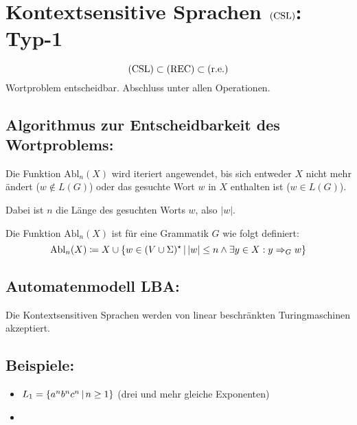 \chapter{Kontextsensitive Sprachen $\mathrm{(CSL)}$: Typ-1}
\begin{equation*}
	\mathrm{(CSL)}\subset\mathrm{(REC)}\subset\mathrm{(r.e.)}
\end{equation*}
Wortproblem entscheidbar. Abschluss unter allen Operationen.

\section{Algorithmus zur Entscheidbarkeit des Wortproblems:}
Die Funktion $\mathrm{Abl}_n(X)$ wird iteriert angewendet, bis sich entweder $X$ nicht mehr ändert ($w\not\in L(G)$) oder das gesuchte Wort $w$ in $X$ enthalten ist ($w\in L(G)$).

Dabei ist $n$ die Länge des gesuchten Worts $w$, also $|w|$.

Die Funktion $\mathrm{Abl}_n(X)$ ist für eine Grammatik $G$ wie folgt definiert:
\begin{equation*}
	\mathrm{Abl}_n(X)\coloneqq X\cup\left\{ w\in(V\cup\Sigma)^\star \,\middle|\, |w|\leq n \wedge \exists y\in X:y\Rightarrow_G w \right\}
\end{equation*}


\section{Automatenmodell LBA:}
Die Kontextsensitiven Sprachen werden von linear beschränkten Turingmaschinen akzeptiert.



\section{Beispiele: }
\begin{itemize}
	\item $L_1=\left\{ a^nb^nc^n \,\middle|\, n\geq 1 \right\}$ (drei und mehr gleiche Exponenten)
	\item
\end{itemize}
